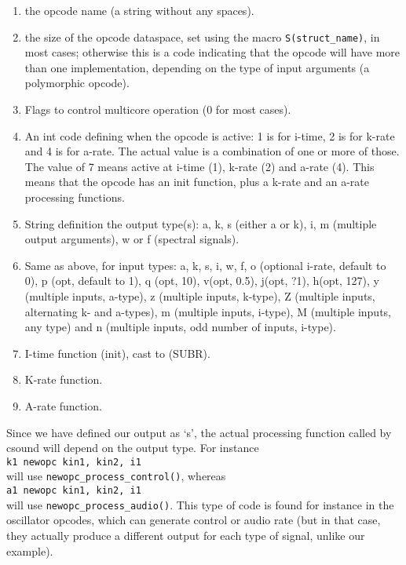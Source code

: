 \documentclass[11pt]{article}
\begin{document}
\begin{enumerate}

\item	the opcode name (a string without any spaces).
\item	the size of the opcode dataspace, set using the macro {\tt S(struct\_name)}, in most cases; otherwise this is a code indicating that the opcode will have more than one implementation, depending on the type of input arguments (a polymorphic opcode).
\item	Flags to control multicore operation (0 for most cases).
\item	An int code defining when the opcode is active: 1 is for i-time, 2 is for k-rate and 4 is for a-rate. The actual value is a combination of one or more of those. The value of 7 means active at i-time (1), k-rate (2) and a-rate (4). This means that the opcode has an init function, plus a k-rate  and an a-rate processing functions.
\item	String definition the output type(s): a, k, s (either a or k), i, m (multiple output arguments), w or  f  (spectral signals).
\item	Same as above, for input types: a, k, s, i, w, f, o (optional i-rate, default to 0), p (opt, default to 1), q (opt, 10),  v(opt, 0.5), j(opt, ?1), h(opt, 127), y (multiple inputs, a-type), z (multiple inputs, k-type), Z (multiple inputs, alternating k- and a-types), m (multiple inputs, i-type), M (multiple inputs, any type) and n (multiple inputs, odd number of inputs, i-type).
\item	I-time function (init), cast to (SUBR).
\item	K-rate function.
\item	A-rate function.

\end{enumerate}

Since we have defined our output as `s', the actual processing function called by csound will depend on the output type. For instance \\

{\tt k1  newopc  kin1, kin2, i1}\\

will use {\tt newopc\_process\_control()}, whereas \\

{\tt a1  newopc  kin1, kin2, i1}\\

will use {\tt newopc\_process\_audio()}. This type of code is found for instance in the oscillator opcodes, which can generate control or audio rate (but in that case, they actually produce a different output for each type of signal, unlike our example).
\end{document}
